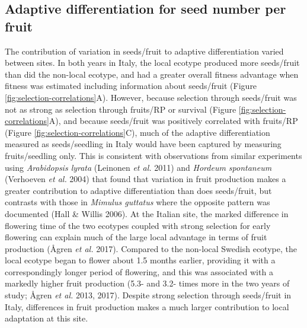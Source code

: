 \documentclass[]{article}
\begin{document}
\hypertarget{adaptive-differentiation-for-seed-number-per-fruit}{%
\subsection{Adaptive differentiation for seed number per fruit}\label{adaptive-differentiation-for-seed-number-per-fruit}}

The contribution of variation in seeds/fruit to adaptive differentiation varied between sites. In both years in Italy, the local ecotype produced more seeds/fruit than did the non-local ecotype, and had a greater overall fitness advantage when fitness was estimated including information about seeds/fruit (Figure \ref{fig:selection-correlations}A). However, because selection through seeds/fruit was not as strong as selection through fruits/RP or survival (Figure \ref{fig:selection-correlations}A), and because seeds/fruit was positively correlated with fruits/RP (Figure \ref{fig:selection-correlations}C), much of the adaptive differentiation measured as seeds/seedling in Italy would have been captured by measuring fruits/seedling only. This is consistent with observations from similar experiments using \emph{Arabidopsis lyrata} (Leinonen \emph{et al.} 2011) and \emph{Hordeum spontaneum} (Verhoeven \emph{et al.} 2004) that found that variation in fruit production makes a greater contribution to adaptive differentiation than does seeds/fruit, but contrasts with those in \emph{Mimulus guttatus} where the opposite pattern was documented (Hall \& Willis 2006). At the Italian site, the marked difference in flowering time of the two ecotypes coupled with strong selection for early flowering can explain much of the large local advantage in terms of fruit production (Ågren \emph{et al.} 2017). Compared to the non-local Swedish ecotype, the local ecotype began to flower about 1.5 months earlier, providing it with a correspondingly longer period of flowering, and this was associated with a markedly higher fruit production (5.3- and 3.2- times more in the two years of study; Ågren \emph{et al.} 2013, 2017). Despite strong selection through seeds/fruit in Italy, differences in fruit production makes a much larger contribution to local adaptation at this site.
\end{document}
